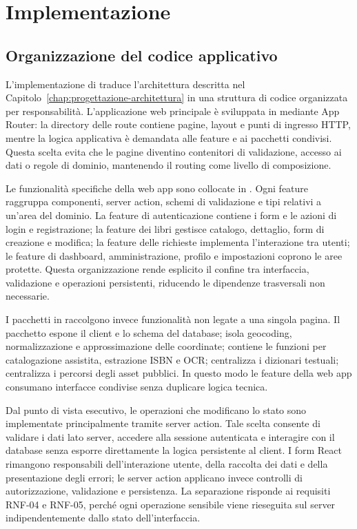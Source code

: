 \chapter{Implementazione}
\label{chap:implementazione}

\section{Organizzazione del codice applicativo}
\label{sec:organizzazione-codice}

L'implementazione di \projectname{} traduce l'architettura descritta nel Capitolo~\ref{chap:progettazione-architettura} in una struttura di codice organizzata per responsabilità. L'applicazione web principale è sviluppata in  mediante \nextjs{} App Router: la directory delle route contiene pagine, layout e punti di ingresso HTTP, mentre la logica applicativa è demandata alle feature e ai pacchetti condivisi. Questa scelta evita che le pagine diventino contenitori di validazione, accesso ai dati o regole di dominio, mantenendo il routing come livello di composizione.

Le funzionalità specifiche della web app sono collocate in . Ogni feature raggruppa componenti, server action, schemi di validazione e tipi relativi a un'area del dominio. La feature di autenticazione contiene i form e le azioni di login e registrazione; la feature dei libri gestisce catalogo, dettaglio, form di creazione e modifica; la feature delle richieste implementa l'interazione tra utenti; le feature di dashboard, amministrazione, profilo e impostazioni coprono le aree protette. Questa organizzazione rende esplicito il confine tra interfaccia, validazione e operazioni persistenti, riducendo le dipendenze trasversali non necessarie.

I pacchetti in  raccolgono invece funzionalità non legate a una singola pagina. Il pacchetto  espone il client \prisma{} e lo schema del database;  isola geocoding, normalizzazione e approssimazione delle coordinate;  contiene le funzioni per catalogazione assistita, estrazione ISBN e OCR;  centralizza i dizionari testuali;  centralizza i percorsi degli asset pubblici. In questo modo le feature della web app consumano interfacce condivise senza duplicare logica tecnica.

Dal punto di vista esecutivo, le operazioni che modificano lo stato sono implementate principalmente tramite server action. Tale scelta consente di validare i dati lato server, accedere alla sessione autenticata e interagire con il database senza esporre direttamente la logica persistente al client. I form React rimangono responsabili dell'interazione utente, della raccolta dei dati e della presentazione degli errori; le server action applicano invece controlli di autorizzazione, validazione e persistenza. La separazione risponde ai requisiti RNF-04 e RNF-05, perché ogni operazione sensibile viene rieseguita sul server indipendentemente dallo stato dell'interfaccia.

